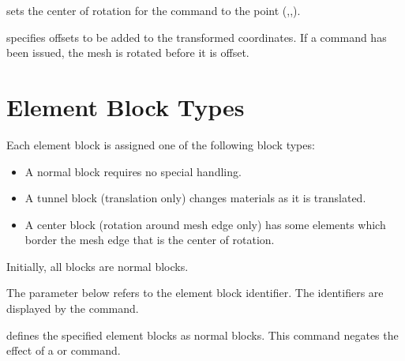  {
 sets the center of rotation for the  command
to the point (,,).
}

\newpage %
 {
 specifies offsets to be added to the transformed 
coordinates. If a  command has been issued, the 
mesh is rotated before it is offset.
}

\newpage
\section{Element Block Types}
\label{cmd:blocktypes}

Each element block is assigned one of the following block types:
\setlength{\itemsep}{\smallskipamount} \begin{itemize}
\item A normal block requires no special handling.
\item A tunnel block (translation only) changes materials as it is
translated.
\item A center block (rotation around mesh edge only) has some elements
which border the mesh edge that is the center of rotation.
\end{itemize}

Initially, all blocks are normal blocks.

The  parameter below refers to the element block identifier.
The identifiers are displayed by the  command.

 {
 defines the specified element blocks
as normal blocks. This command
negates the effect of a  or  command.
}


